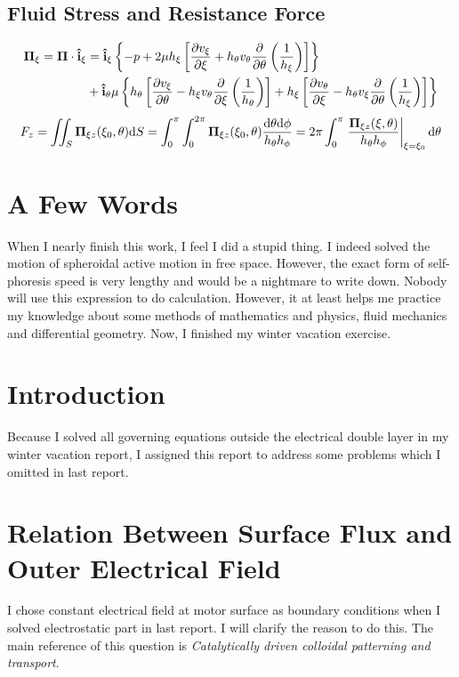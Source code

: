 \documentclass[fontsize=11pt, %
                             paper=a4, %
                             twoside, %
                             captions=tableheading,
                             index=totoc,
                             hyperref]{labbook}
\begin{document}
\begin{addmargin}[4cm]{0cm}
\subsection{Fluid Stress and Resistance Force}
\begin{equation}
\begin{aligned}
\mbox{\boldmath$ \Pi $}_\xi=\mbox{\boldmath$ \Pi $} \cdot \mathbf{\hat{i}}_\xi&=
\mathbf{\hat{i}}_\xi \left\{-p+2\mu h_\xi \left[\frac{\partial v_\xi}{\partial \xi}+h_\theta v_\theta \frac{\partial }{\partial \theta}\left(\frac{1}{h_\xi}\right)\right]\right\}\\
&+\mathbf{\hat{i}}_\theta \mu \left\{h_\theta\left[\frac{\partial v_\xi}{\partial \theta}-h_\xi v_\theta \frac{\partial }{\partial \xi}\left(\frac{1}{h_\theta}\right)\right]+h_\xi\left[\frac{\partial v_\theta}{\partial \xi}-h_\theta v_\xi \frac{\partial }{\partial \theta}\left(\frac{1}{h_\xi}\right)\right]\right\}
\end{aligned}
\end{equation}
\begin{equation}
F_z=\iint_S\mbox{\boldmath$ \Pi $}_{\xi z}(\xi_0,\theta)\mathrm{d}S=\int_0^\pi\int_0^{2\pi} \mbox{\boldmath$ \Pi $}_{\xi z}(\xi_0,\theta)\frac{\mathrm{d}\theta\mathrm{d}\phi}{h_\theta h_\phi}=2\pi\int_0^\pi \left.\frac{\mbox{\boldmath$ \Pi $}_{\xi z}(\xi,\theta)}{h_\theta h_\phi}\right|_{\xi=\xi_0}\mathrm{d}\theta
\end{equation}
\section{A Few Words}
When I nearly finish this work, I feel I did a stupid thing. I indeed solved the motion of spheroidal active motion in free space. However, the exact form of self-phoresis speed is very lengthy and would be a nightmare to write down. Nobody will use this expression to do calculation. However, it at least helps me practice my knowledge about some methods of mathematics and physics, fluid mechanics and differential geometry. Now, I finished my winter vacation exercise.
\section{Introduction}
Because I solved all governing equations outside the electrical double layer in my winter vacation report, I assigned this report to address some problems which I omitted in last report. 
\section{Relation Between Surface Flux and Outer Electrical Field}
I chose constant electrical field at motor surface as boundary conditions when I solved electrostatic part in last report. I will clarify the reason to do this. The main reference of this question is \emph{Catalytically driven colloidal patterning and transport}\cite{Kline2006}.

\end{addmargin}
\end{document}

